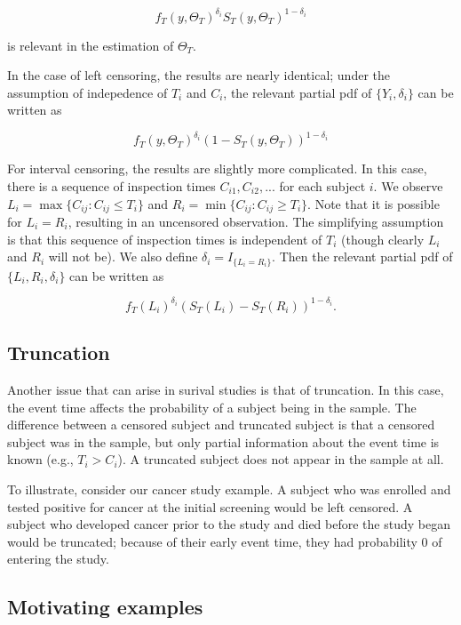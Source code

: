\documentclass[a4paper]{article}
\begin{document}
  \[
  f_T(y, \Theta_T)^{\delta_i} S_T(y, \Theta_T)^{1-\delta_i}
  \]

is relevant in the estimation of $\Theta_T$. 

  In the case of left censoring, the results are nearly identical; under the assumption of indepedence of $T_i$ and $C_i$, the relevant partial pdf of $\{Y_i, \delta_i\}$ can be written as 
  
  \[
  f_T(y, \Theta_T)^{\delta_i} (1-S_T(y, \Theta_T))^{1-\delta_i}
  \]
  
  For interval censoring, the results are slightly more complicated. In this case, there is a sequence of inspection times $C_{i1}, C_{i2}, ...$ for each subject $i$. We observe $L_i = \max\{C_{ij}: C_{ij} \leq T_i\}$ and $R_i = \min \{C_{ij}: C_{ij} \geq T_i\}$. Note that it is possible for $L_i = R_i$, resulting in an uncensored observation. The simplifying assumption is that this sequence of inspection times is independent of $T_i$ (though clearly $L_i$ and $R_i$ will not be). We also define $\delta_i = I_{\{L_i = R_i\}}$. Then the relevant partial pdf of $\{L_i, R_i, \delta_i\}$ can be written as 
  
  \[
  f_T(L_i) ^ {\delta_i} (S_T(L_i) - S_T(R_i)) ^ {1 -\delta_i}.
  \]

  \subsection{Truncation}
  
  Another issue that can arise in surival studies is that of truncation. In this case, the event time affects the probability of a subject being in the sample. The difference between a censored subject and truncated subject is that a censored subject was in the sample, but only partial information about the event time is known (e.g., $T_i > C_i$). A truncated subject does not appear in the sample at all. 
  
  To illustrate, consider our cancer study example. A subject who was enrolled and tested positive for cancer at the initial screening would be left censored. A subject who developed cancer prior to the study and died before the study began would be truncated; because of their early event time, they had probability 0 of entering the study. 

  \subsection{Motivating examples}
    
\end{document}
